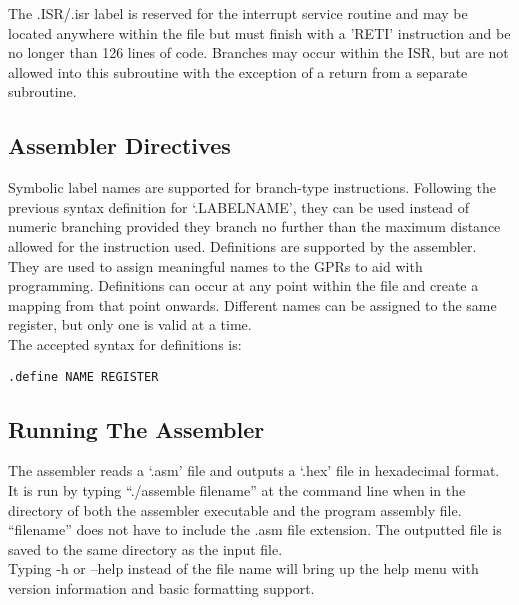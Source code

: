 \noindent The .ISR/.isr label is reserved for the interrupt service routine and may be located anywhere within the file but must finish with a 'RETI' instruction and be no longer than 126 lines of code. Branches may occur within the ISR, but are not allowed into this subroutine with the exception of a return from a separate subroutine.\\

\subsection{Assembler Directives}
Symbolic label names are supported for branch-type instructions. Following the previous syntax definition for `.LABELNAME', they can be used instead of numeric branching provided they branch no further than the maximum distance allowed for the instruction used. 
Definitions are supported by the assembler. 
They are used to assign meaningful names to the GPRs to aid with programming.
Definitions can occur at any point within the file and create a mapping from that point onwards. 
Different names can be assigned to the same register, but only one is valid at a time. \\


\noindent The accepted syntax for definitions is:

\begin{center}\texttt{.define NAME REGISTER}\end{center}

\subsection{Running The Assembler}
The assembler reads a `.asm' file and outputs a `.hex' file in hexadecimal format. 
It is run by typing ``./assemble filename'' at the command line when in the directory of both the assembler executable and the program assembly file. ``filename'' does not have to include the .asm file extension. 
The outputted file is saved to the same directory as the input file. \\
\noindent Typing -h or --help instead of the file name will bring up the help menu with version information and basic formatting support. 

\newpage
